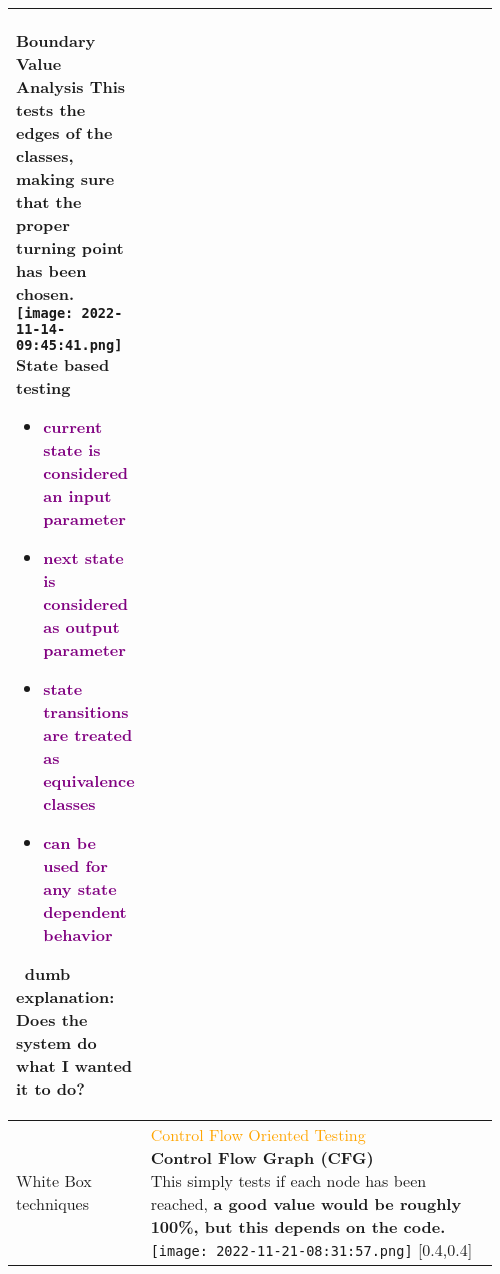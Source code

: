 \documentclass[main.tex,fontsize=8pt,paper=a4,paper=portrait,DIV=calc,]{scrartcl}
\begin{document}
\begin{table}[ht!]
\begin{tabular}{|m{0.2\linewidth}|m{0.755\linewidth}|}
\textcolor{OliveGreen}{Boundary Value Analysis}\newline
This tests the edges of the classes, making sure that the proper turning point has been chosen.\newline
\texttt{[image: 2022-11-14-09:45:41.png]}\newline
\textcolor{OliveGreen}{State based testing}\newline
\begin{itemize}
\item \textcolor{purple}{current state is considered an input parameter}
\item \textcolor{purple}{next state is considered as output parameter}
\item \textcolor{purple}{state transitions are treated as equivalence classes}
\item \textcolor{purple}{can be used for any state dependent behavior}
\vspace{-3mm}
\end{itemize} 
\, \newline
dumb explanation: Does the system do what I wanted it to do?\\
\hline
White Box techniques & 
\minipg{
\textcolor{orange}{Control Flow Oriented Testing}\newline
\textbf{Control Flow Graph (CFG)}\newline
This simply tests if each node has been reached, \textbf{a good value would be roughly 100\%, but this depends on the code. }
}{
\texttt{[image: 2022-11-21-08:31:57.png]} 
}[0.4,0.4]\\
\hline
\end{tabular}
\end{table}
\pagebreak
\end{document}
